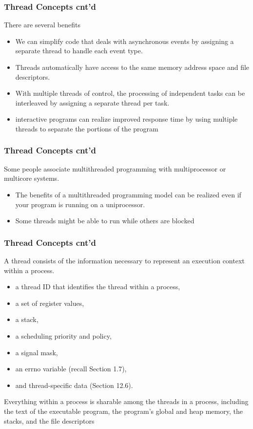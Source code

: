 \documentclass[newPxFont,sthlmFooter,nooffset]{beamer}
\begin{document}
\begin{frame}[t]
  \frametitle{Thread Concepts cnt'd}
There are several benefits
\begin{itemize}
\item We can simplify code that deals with asynchronous events by assigning a separate thread to handle each event type. 
\item Threads automatically have access to the same memory address space and file descriptors.
\item  With multiple threads of control, the processing of independent tasks can be interleaved by assigning a separate thread per task. 
\item  interactive programs can realize improved response time by using multiple threads to separate the portions of the program
\end{itemize}
\end{frame}



\begin{frame}[t]
  \frametitle{Thread Concepts cnt'd}
  Some people associate multithreaded programming with multiprocessor or multicore systems. 
  \begin{itemize}
  \item The benefits of a multithreaded programming model can be
    realized even if your program is running on a uniprocessor.
  \item Some threads might be able to run while others are blocked
  \end{itemize}


\end{frame}



\begin{frame}[t]
  \frametitle{Thread Concepts cnt'd}
  A thread consists of the information necessary to represent an
    execution context within a process.
  \begin{itemize}
    \item  a thread ID that identifies the thread within a process,
    \item a set of register values,
    \item a stack,
    \item a scheduling priority and policy,
    \item a signal mask,
    \item an errno variable (recall Section 1.7),
    \item and thread-specific data (Section 12.6). 
  \end{itemize}
Everything within a process is sharable among the threads in a process, including the text of the executable program, the program’s global and heap memory, the stacks, and the file descriptors

\end{frame}
\end{document}
